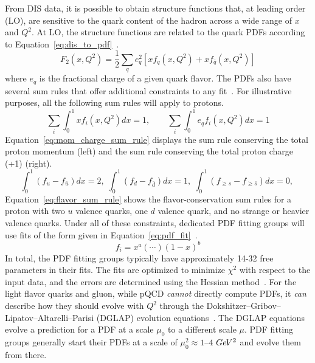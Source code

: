 From DIS data, it is possible to obtain structure functions that, at leading order (LO), are sensitive to the quark content of the hadron across a wide range of $x$ and $Q^2$.
At LO, the structure functions are related to the quark PDFs according to Equation~\ref{eq:dis_to_pdf}~\cite{DISref}.
\begin{equation}
    \label{eq:dis_to_pdf}
    F_2(x, Q^2) = \frac{1}{2} \sum_{q} e^2_q \left[xf_q(x,Q^2) +xf_{\bar{q}}(x,Q^2)\right]
\end{equation}
where $e_q$ is the fractional charge of a given quark flavor.
The PDFs also have several sum rules that offer additional constraints to any fit~\cite{factorthrm}.
For illustrative purposes, all the following sum rules will apply to protons.
\begin{equation}
    \label{eq:mom_charge_sum_rule}
    \sum_{i}\int_{0}^{1} x f_i(x,Q^2) dx = 1,  \qquad \sum_{i}\int_{0}^{1} e_q f_i(x,Q^2) dx = 1
\end{equation}
Equation~\ref{eq:mom_charge_sum_rule} displays the sum rule conserving the total proton momentum (left) and the sum rule conserving the total proton charge (+1) (right).
\begin{equation}
    \label{eq:flavor_sum_rule}
    \int_{0}^{1} (f_u-f_{\bar{u}} ) dx = 2,  \;  \int_{0}^{1} (f_d-f_{\bar{d}} ) dx = 1,  \;\int_{0}^{1} (f_{\ge s}-f_{\ge\bar{s}} ) dx = 0, \;
\end{equation}
Equation~\ref{eq:flavor_sum_rule} shows the flavor-conservation sum rules for a proton with two $u$ valence quarks, one $d$ valence quark, and no strange or heavier valence quarks.
Under all of these constraints, dedicated PDF fitting groups will use fits of the form given in Equation~\ref{eq:pdf_fit}~\cite{pdg}.
\begin{equation}
    \label{eq:pdf_fit}
    f_i = x^a \left(\cdots\right)\left(1-x\right)^b
\end{equation}
In total, the PDF fitting groups typically have approximately 14-32 free parameters in their fits.
The fits are optimized to minimize $\chi^2$ with respect to the input data, and the errors are determined using the Hessian method~\cite{pdg}.
For the light flavor quarks and gluon, while pQCD \textit{cannot} directly compute PDFs, it \textit{can} describe how they should evolve with $Q^2$ through the Dokshitzer–Gribov–Lipatov–Altarelli–Parisi (DGLAP) evolution equations~\cite{DGLAP}.
The DGLAP equations evolve a prediction for a PDF at a scale $\mu_0$ to a different scale $\mu$.
PDF fitting groups generally start their PDFs at a scale of $\mu_0^2 \approx 1$--$4~Ge\kern-0.1em V^2$ and evolve them from there.
